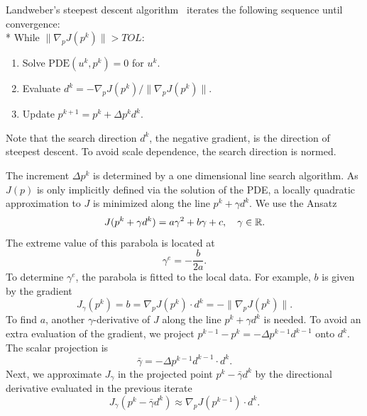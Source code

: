 Landweber's steepest descent algorithm~\citep{Landweber1951} iterates the
following sequence until convergence:
\\*
While $\| \nabla_pJ(p^k) \| > TOL$:
\begin{enumerate}
\item Solve $\mathrm{PDE}(u^k,p^k)=0$ for $u^k$.
\item Evaluate $d^k=-\nabla_pJ(p^k) / \| \nabla_pJ(p^k) \|$.
\item Update $p^{k+1}=p^k+\Delta p^k d^k$.
\end{enumerate}

Note that the search direction $d^k$, the negative gradient, is the
direction of steepest descent. To avoid scale dependence, the search
direction is normed.

The increment $\Delta p^k$ is determined by a one dimensional line
search algorithm.  As $J(p)$ is only implicitly defined via the
solution of the PDE, a locally quadratic approximation to $J$ is
minimized along the line $p^k + \gamma d^k$.  We use the Ansatz
\begin{equation}\label{eq:schroll:ansatz}
 J(p^k + \gamma d^k) = a \gamma^2 + b \gamma + c, \quad \gamma \in \mathbb{R}.
\end{equation}
The extreme value of this parabola is located at
\begin{equation} \label{eq:schroll:gamma}
 \gamma^e = - \frac{b}{2a}.
\end{equation}
To determine $\gamma^e$, the parabola is fitted to the local data.
For example, $b$ is given by the gradient
\begin{equation}\label{eq:schroll:b}
 J_\gamma(p^k) = b = \nabla_p J(p^k) \cdot d^k = - \| \nabla_p J(p^k) \|.
\end{equation}
To find $a$, another $\gamma$-derivative of $J$ along the line $p^k
+ \gamma d^k$ is needed.  To avoid an extra evaluation of the
gradient, we project $p^{k-1}-p^{k}=-\Delta p^{k-1}d^{k-1}$ onto
$d^{k}$.  The scalar projection is
\begin{equation}\label{eq:schroll:projection}
 \bar\gamma = -\Delta p^{k-1} d^{k-1} \cdot d^k.
\end{equation}
Next, we approximate $J_\gamma$ in the projected point $p^k-\bar\gamma d^k$
by the directional derivative evaluated in the previous iterate
\begin{equation} \label{eq:schroll:approx}
 J_\gamma(p^k-\bar\gamma d^k) \approx \nabla_p J(p^{k-1}) \cdot d^k .
\end{equation}

